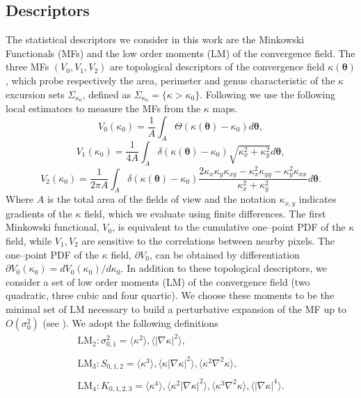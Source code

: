 \documentclass[reprint,aps,prd,superscriptaddress,showkeys,showpacs]{revtex4-1}
\begin{document}
\subsection{Descriptors}
The statistical descriptors we consider in this work are the Minkowski Functionals (MFs) and the low order moments (LM) of the convergence field. The three MFs $(V_0,V_1,V_2)$ are topological descriptors of the convergence field $\kappa(\pmb{\theta})$, which probe respectively the area, perimeter and genus characteristic of the $\kappa$ excursion sets $\Sigma_{\kappa_0}$, defined as $\Sigma_{\kappa_0}=\{\kappa>\kappa_0\}$. Following \citep{Petri2013,MinkJan} we use the following local estimators to measure the MFs from the $\kappa$ maps. 
%
\begin{equation*}
\label{v0meas}
V_0(\kappa_0)=\frac{1}{A}\int_A\Theta(\kappa(\pmb{\theta})-\kappa_0)d\pmb{\theta},
\end{equation*}
\begin{equation}
\label{v1meas}
V_1(\kappa_0)=\frac{1}{4A}\int_A\delta(\kappa(\pmb{\theta})-\kappa_0)\sqrt{\kappa_x^2+\kappa_y^2}d\pmb{\theta},
\end{equation}
\begin{equation*}
\label{v2meas}
V_2(\kappa_0)=\frac{1}{2\pi A}\int_A\delta(\kappa(\pmb{\theta})-\kappa_0)\frac{2\kappa_x\kappa_y\kappa_{xy}-\kappa_x^2\kappa_{yy}-\kappa_y^2\kappa_{xx}}{\kappa_x^2+\kappa_y^2}d\pmb{\theta}.
\end{equation*}
%
Where $A$ is the total area of the fields of view and the notation $\kappa_{x,y}$ indicates gradients of the $\kappa$ field, which we evaluate using finite differences. The first Minkowski functional, $V_0$, is equivalent to the cumulative one--point PDF of the $\kappa$ field, while $V_1,V_2$ are sensitive to the correlations between nearby pixels. The one--point PDF of the $\kappa$ field, $\partial V_0$, can be obtained by differentiation $\partial V_0(\kappa_0)=dV_0(\kappa_0)/d\kappa_0$. In addition to these topological descriptors, we consider a set of low order moments (LM) of the convergence field (two quadratic, three cubic and four quartic). We choose these moments to be the minimal set of LM necessary to build a perturbative expansion of the MF up to $O(\sigma_0^2)$ (see \citep{Munshi12,Matsubara10}). We adopt the following definitions
%
\begin{equation}
\label{momentestimator}
\begin{matrix}
\mathrm{LM_2}: \sigma_{0,1}^2 = \langle\kappa^2\rangle,\langle\vert\nabla\kappa\vert^2\rangle, \\ \\
\mathrm{LM_3}: S_{0,1,2} = \langle\kappa^3\rangle,\langle\kappa\vert\nabla\kappa\vert^2\rangle,\langle\kappa^2\nabla^2\kappa\rangle, \\ \\
\mathrm{LM_4}: K_{0,1,2,3} = \langle\kappa^4\rangle,\langle\kappa^2\vert\nabla\kappa\vert^2\rangle,\langle\kappa^3\nabla^2\kappa\rangle,\langle\vert\nabla\kappa\vert^4\rangle.
\end{matrix}
\end{equation}
%
\end{document}
